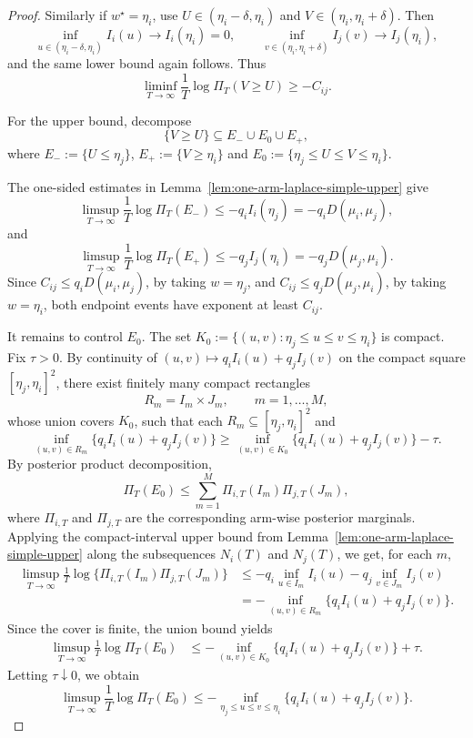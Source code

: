 \documentclass[10pt]{article}
\theoremstyle{plain}
\begin{document}
\begin{proof}
\noindent Similarly if \(w^\star=\eta_i\), use $U\in(\eta_i-\delta,\eta_i)$ and $V\in(\eta_i,\eta_i+\delta)$.
Then
\[
    \inf_{u\in(\eta_i-\delta,\eta_i)} I_i(u)\to I_i(\eta_i)=0,
    \qquad
    \inf_{v\in(\eta_i,\eta_i+\delta)} I_j(v)\to I_j(\eta_i),
\]
and the same lower bound again follows.  Thus
\[
    \liminf_{T\to\infty}
    \frac1T\log \varPi_T(V\ge U)
    \ge
    -C_{ij}.
\]

For the upper bound, decompose
\[
    \{V\ge U\}
    \subseteq
    E_-\cup E_0\cup E_+,
\]
where $E_-:=\{U\le \eta_j\}$, $E_+:=\{V\ge \eta_i\}$ and $E_0:=\{\eta_j\le U\le V\le \eta_i\}$.

The one-sided estimates in Lemma~\ref{lem:one-arm-laplace-simple-upper} give
\[
    \limsup_{T\to\infty}
    \frac1T\log\varPi_T(E_-)
    \le
    -q_i I_i(\eta_j)
    =
    -q_iD(\mu_i,\mu_j),
\]
and
\[
    \limsup_{T\to\infty}
    \frac1T\log\varPi_T(E_+)
    \le
    -q_j I_j(\eta_i)
    =
    -q_jD(\mu_j,\mu_i).
\]
Since \(C_{ij}\le q_iD(\mu_i,\mu_j)\), by taking \(w=\eta_j\), and
\(C_{ij}\le q_jD(\mu_j,\mu_i)\), by taking \(w=\eta_i\), both endpoint events have
exponent at least \(C_{ij}\).

It remains to control \(E_0\).  The set $K_0:=\{(u,v):\eta_j\le u\le v\le \eta_i\}$ is compact.  Fix \(\tau>0\).  By continuity of $(u,v)\mapsto q_iI_i(u)+q_jI_j(v)$
on the compact square \([\eta_j,\eta_i]^2\), there exist finitely many compact
rectangles
\[
    R_m=I_m\times J_m,\qquad m=1,\ldots,M,
\]
whose union covers \(K_0\), such that each \(R_m\subseteq[\eta_j,\eta_i]^2\) and
\[
    \inf_{(u,v)\in R_m}
    \{q_iI_i(u)+q_jI_j(v)\}
    \ge
    \inf_{(u,v)\in K_0}
    \{q_iI_i(u)+q_jI_j(v)\}
    -\tau .
\]
By posterior product decomposition,
\[
    \varPi_T(E_0)
    \le
    \sum_{m=1}^M
    \varPi_{i,T}(I_m)\varPi_{j,T}(J_m),
\]
where \(\varPi_{i,T}\) and \(\varPi_{j,T}\) are the corresponding arm-wise posterior
marginals.  Applying the compact-interval upper bound from
Lemma~\ref{lem:one-arm-laplace-simple-upper} along the subsequences
\(N_i(T)\) and \(N_j(T)\), we get, for each \(m\),
\[
\begin{aligned}
    \limsup_{T\to\infty}
    \frac1T\log\{\varPi_{i,T}(I_m)\varPi_{j,T}(J_m)\}
    &\le
    -q_i\inf_{u\in I_m}I_i(u)
    -q_j\inf_{v\in J_m}I_j(v)  \\
    &=
    -\inf_{(u,v)\in R_m}
    \{q_iI_i(u)+q_jI_j(v)\}.
\end{aligned}
\]
Since the cover is finite, the union bound yields
\[
\begin{aligned}
    \limsup_{T\to\infty}
    \frac1T\log\varPi_T(E_0)
    &\le
    -
    \inf_{(u,v)\in K_0}
    \{q_iI_i(u)+q_jI_j(v)\}
    +\tau .
\end{aligned}
\]
Letting \(\tau\downarrow0\), we obtain
\[
    \limsup_{T\to\infty}
    \frac1T\log\varPi_T(E_0)
    \le
    -
    \inf_{\eta_j\le u\le v\le \eta_i}
    \{q_iI_i(u)+q_jI_j(v)\}.
\]


\end{proof}
\end{document}
